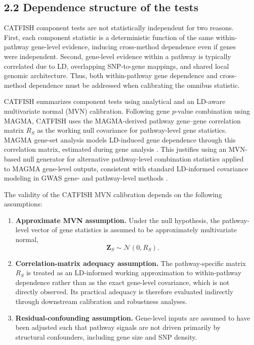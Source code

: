 \documentclass[unnumsec,webpdf,contemporary,large]{oup-authoring-template}%
\theoremstyle{thmstyleone}%
\theoremstyle{thmstyletwo}%
\theoremstyle{thmstylethree}%
\begin{document}
\subsection*{2.2 Dependence structure of the tests}

CATFISH component tests are not statistically independent for two reasons. First, each component statistic is a deterministic function of the same within-pathway gene-level evidence, inducing cross-method dependence even if genes were independent. Second, gene-level evidence within a pathway is typically correlated due to LD, overlapping SNP-to-gene mappings, and shared local genomic architecture. Thus, both within-pathway gene dependence and cross-method dependence must be addressed when calibrating the omnibus statistic.

CATFISH summarizes component tests using analytical and an LD-aware multivariate normal (MVN) calibration. Following gene $p$-value combination using MAGMA, CATFISH uses the MAGMA-derived pathway gene--gene correlation matrix $R_S$ as the working null covariance for pathway-level gene statistics. MAGMA gene-set analysis models LD-induced gene dependence through this correlation matrix, estimated during gene analysis \citep{deLeeuw2015}. This justifies using an MVN-based null generator for alternative pathway-level combination statistics applied to MAGMA gene-level outputs, consistent with standard LD-informed covariance modeling in GWAS gene- and pathway-level methods \citep{deLeeuw2015}.

The validity of the CATFISH MVN calibration depends on the following assumptions:

\begin{enumerate}
    \item \textbf{Approximate MVN assumption.} Under the null hypothesis, the pathway-level vector of gene statistics is assumed to be approximately multivariate normal,
    \[
    \mathbf{Z}_S \sim \mathcal{N}(0,R_S).
    \]

    \item \textbf{Correlation-matrix adequacy assumption.} The pathway-specific matrix $R_S$ is treated as an LD-informed working approximation to within-pathway dependence rather than as the exact gene-level covariance, which is not directly observed. Its practical adequacy is therefore evaluated indirectly through downstream calibration and robustness analyses.

    \item \textbf{Residual-confounding assumption.} Gene-level inputs are assumed to have been adjusted such that pathway signals are not driven primarily by structural confounders, including gene size and SNP density.
\end{enumerate}
\end{document}
